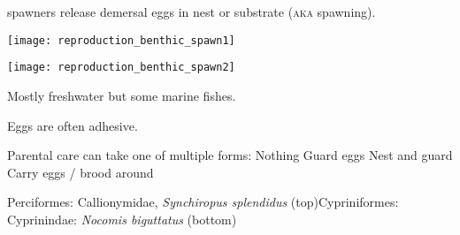 \label{key}\documentclass[t]{beamer}
\begin{document}
\begin{frame}[t]{ spawners release demersal eggs in nest or substrate (\textsc{aka}  spawning).}

\vspace*{-\baselineskip}

\begin{multicols}{2}

\texttt{[image: reproduction\_benthic\_spawn1]}
\vspace*{0.1ex}

\texttt{[image: reproduction\_benthic\_spawn2]}

\columnbreak

Mostly freshwater but some marine fishes.
\vspace*{\baselineskip}

Eggs are often adhesive.
\vspace*{\baselineskip}

Parental care can take one of multiple forms:\newline
\hspace*{1em} Nothing \newline
\hspace*{1em} Guard eggs \newline
\hspace*{1em} Nest and guard \newline
\hspace*{1em} Carry eggs / brood around 

\end{multicols}

\vfilll

\tiny Perciformes: Callionymidae, \textit{Synchiropus splendidus} (top)\hfill Cypriniformes: Cyprinindae: \textit{Nocomis biguttatus} (bottom)

\end{frame}
\end{document}
